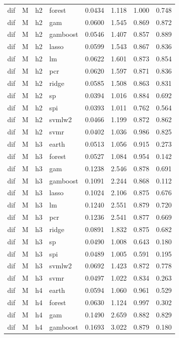 \begin{ThreePartTable}
\begin{longtable}[t]{llclcccc}
dif & M & h2 & forest & 0.0434 & 1.118 & 1.000 & 0.748\\
dif & M & h2 & gam & 0.0600 & 1.545 & 0.869 & 0.872\\
dif & M & h2 & gamboost & 0.0546 & 1.407 & 0.857 & 0.889\\
dif & M & h2 & lasso & 0.0599 & 1.543 & 0.867 & 0.836\\
dif & M & h2 & lm & 0.0622 & 1.601 & 0.873 & 0.854\\
dif & M & h2 & pcr & 0.0620 & 1.597 & 0.871 & 0.836\\
dif & M & h2 & ridge & 0.0585 & 1.508 & 0.863 & 0.831\\
dif & M & h2 & sp & 0.0394 & 1.016 & 0.884 & 0.692\\
dif & M & h2 & spi & 0.0393 & 1.011 & 0.762 & 0.564\\
dif & M & h2 & svmlw2 & 0.0466 & 1.199 & 0.872 & 0.862\\
dif & M & h2 & svmr & 0.0402 & 1.036 & 0.986 & 0.825\\
\addlinespace
dif & M & h3 & earth & 0.0513 & 1.056 & 0.915 & 0.273\\
dif & M & h3 & forest & 0.0527 & 1.084 & 0.954 & 0.142\\
dif & M & h3 & gam & 0.1238 & 2.546 & 0.878 & 0.691\\
dif & M & h3 & gamboost & 0.1091 & 2.244 & 0.868 & 0.112\\
dif & M & h3 & lasso & 0.1024 & 2.106 & 0.875 & 0.676\\
dif & M & h3 & lm & 0.1240 & 2.551 & 0.879 & 0.720\\
dif & M & h3 & pcr & 0.1236 & 2.541 & 0.877 & 0.669\\
dif & M & h3 & ridge & 0.0891 & 1.832 & 0.875 & 0.682\\
dif & M & h3 & sp & 0.0490 & 1.008 & 0.643 & 0.180\\
dif & M & h3 & spi & 0.0489 & 1.005 & 0.591 & 0.195\\
dif & M & h3 & svmlw2 & 0.0692 & 1.423 & 0.872 & 0.778\\
dif & M & h3 & svmr & 0.0497 & 1.022 & 0.834 & 0.263\\
\addlinespace
dif & M & h4 & earth & 0.0594 & 1.060 & 0.961 & 0.529\\
dif & M & h4 & forest & 0.0630 & 1.124 & 0.997 & 0.302\\
dif & M & h4 & gam & 0.1490 & 2.659 & 0.882 & 0.829\\
dif & M & h4 & gamboost & 0.1693 & 3.022 & 0.879 & 0.180\\

\end{longtable}
\end{ThreePartTable}

